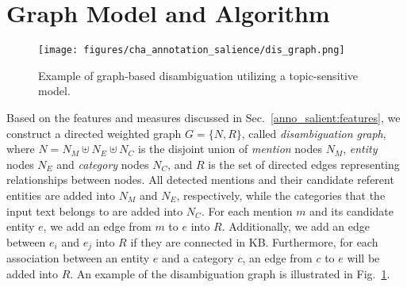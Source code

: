 \section{Graph Model and Algorithm} \label{anno_salient:graph}

\begin{figure}[!tb]
\centering
\texttt{[image: figures/cha\_annotation\_salience/dis\_graph.png]}
\caption{Example of graph-based disambiguation utilizing a topic-sensitive model.}  \label{anno_salient:fig:dis}
\end{figure}

Based on the features and measures discussed in Sec.~\ref{anno_salient:features}, we construct a directed weighted graph $G=\{N,R\}$, called \emph{disambiguation graph}, where $N=N_M \uplus N_E \uplus N_C$ is the disjoint union of \emph{mention} nodes $N_M$, \emph{entity} nodes $N_E$ and \emph{category} nodes $N_C$, and $R$ is the set of directed edges representing relationships between nodes. All detected mentions and their candidate referent entities are added into $N_M$ and $N_E$, respectively, while the categories that the input text belongs to are added into $N_C$. For each mention $m$ and its candidate entity $e$, we add an edge from $m$ to $e$ into $R$. Additionally, we add an edge between $e_i$ and $e_j$ into $R$ if they are connected in KB. Furthermore, for each association between an entity $e$ and a category $c$, an edge from $c$ to $e$ will be added into $R$. An example of the disambiguation graph is illustrated in Fig.~\ref{anno_salient:fig:dis}.

